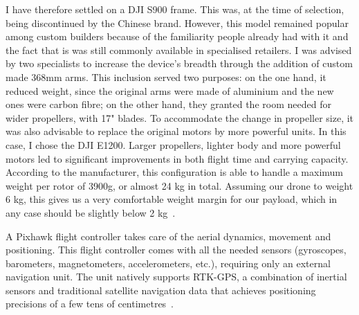 I have therefore settled on a DJI S900 frame. This was, at the time of
selection, being discontinued by the Chinese brand. However, this model
remained popular among custom builders because of the familiarity people
already had with it and the fact that is was still commonly available in
specialised retailers. I was advised by two specialists to increase the
device's breadth through the addition of custom made 368mm arms. This
inclusion served two purposes: on the one hand, it reduced weight, since
the original arms were made of aluminium and the new ones were carbon
fibre; on the other hand, they granted the room needed for wider
propellers, with 17" blades. To accommodate the change in propeller
size, it was also advisable to replace the original motors by more
powerful units. In this case, I chose the DJI E1200. Larger propellers,
lighter body and more powerful motors led to significant improvements in
both flight time and carrying capacity. According to the manufacturer,
this configuration is able to handle a maximum weight per rotor of
3900g, or almost 24 kg in total. Assuming our drone to weight 6 kg, this
gives us a very comfortable weight margin for our payload, which in any
case should be slightly below 2 kg~.

A Pixhawk flight controller takes care of the aerial dynamics, movement
and positioning. This flight controller comes with all the needed
sensors (gyroscopes, barometers, magnetometers, accelerometers, etc.),
requiring only an external navigation unit. The unit natively supports
\gls{RTK-GPS}, a combination of inertial sensors and traditional
satellite navigation data that achieves positioning precisions of a few
tens of centimetres~.

